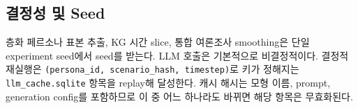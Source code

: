 \documentclass[11pt]{article}
\begin{document}
\subsection{결정성 및 Seed}

층화 페르소나 표본 추출, KG 시간 slice, 통합 여론조사 smoothing은 단일 experiment seed에서 seed를 받는다. LLM 호출은 기본적으로 비결정적이다. 결정적 재실행은 \texttt{(persona\_id, scenario\_hash, timestep)}로 키가 정해지는 \texttt{llm\_cache.sqlite} 항목을 replay해 달성한다. 캐시 해시는 모형 이름, prompt, generation config를 포함하므로 이 중 어느 하나라도 바뀌면 해당 항목은 무효화된다.
\end{document}
